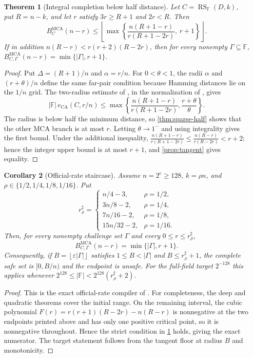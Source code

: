 \documentclass[11pt,a4paper]{amsart}
\numberwithin{equation}{section}
\newtheorem{theorem}{Theorem}[section]
\newtheorem{corollary}[theorem]{Corollary}
\theoremstyle{remark}
\DeclareMathOperator{\RS}{RS}
\DeclareMathOperator{\MCA}{MCA}
\DeclareMathOperator{\CA}{CA}
\newcommand{\F}{\mathbb F}
\newcommand{\eps}{\varepsilon}
\newcommand{\floor}[1]{\left\lfloor#1\right\rfloor}
\begin{document}
\begin{theorem}[Integral completion below half distance]\label{thm:integral-half}
Let $C=\RS_{\F}(D,k)$, put $R=n-k$, and let $r$ satisfy $3r\ge R+1$ and $2r<R$.  Then
\[
 B_C^{\MCA}(n-r)\le
 \floor{\max\left\{\frac{n(R+1-r)}{r(R+1-2r)},\ r+1\right\}}.
\]
If in addition $n(R-r)<r(r+2)(R-2r)$, then for every nonempty $\Gamma\subseteq\F$,
$B_{C,\Gamma}^{\MCA}(n-r)=\min\{|\Gamma|,r+1\}$.
\end{theorem}

\begin{proof}
Put $\Delta=(R+1)/n$ and $\alpha=r/n$.  For $0<\theta<1$, the radii $\alpha$ and $(r+\theta)/n$ define the same far-pair condition because Hamming distances lie on the $1/n$ grid.  The two-radius estimate of \cite[Theorem~1.3]{BCHKS25}, in the normalization of \cite[Theorem ``Integral BCHKS completion'']{ChoShort26}, gives
\[
 |\F|\,e_{\CA}(C,r/n)\le
 \max\left\{\frac{n(R+1-r)}{r(R+1-2r)},\frac{r+\theta}{\theta}\right\}.
\]
The radius is below half the minimum distance, so \cref{thm:sparse-half} shows that the other MCA branch is at most $r$.  Letting $\theta\to1^-$ and using integrality gives the first bound.  Under the additional inequality,
$\frac{n(R+1-r)}{r(R+1-2r)}\le\frac{n(R-r)}{r(R-2r)}<r+2$; hence the integer upper bound is at most $r+1$, and \cref{prop:tangent} gives equality.
\end{proof}

\begin{corollary}[Official-rate staircase]\label{cor:official-half}
Assume $n=2^e\ge128$, $k=\rho n$, and $\rho\in\{1/2,1/4,1/8,1/16\}$.  Put
\[
 r_\rho^\sharp=\begin{cases}
 n/4-3,&\rho=1/2,\\
 3n/8-2,&\rho=1/4,\\
 7n/16-2,&\rho=1/8,\\
 15n/32-2,&\rho=1/16.
 \end{cases}
\]
Then, for every nonempty challenge set $\Gamma$ and every $0\le r\le r_\rho^\sharp$,
\[
 B_{C,\Gamma}^{\MCA}(n-r)=\min\{|\Gamma|,r+1\}.
\]
Consequently, if $B=\floor{\eps|\Gamma|}$ satisfies $1\le B<|\Gamma|$ and $B\le r_\rho^\sharp+1$, the complete safe set is $[0,B/n)$ and the endpoint is unsafe.  For the full-field target $2^{-128}$ this applies whenever $2^{128}\le|\F|<2^{128}(r_\rho^\sharp+2)$.
\end{corollary}

\begin{proof}
This is the exact official-rate compiler of \cite[Corollaries ``Official-rate staircase'' and ``Almost-half-distance target compiler'']{ChoShort26}.  For completeness, the deep and quadratic theorems cover the initial range.  On the remaining interval, the cubic polynomial
$F(r)=r(r+1)(R-2r)-n(R-r)$ is nonnegative at the two endpoints printed above and has only one positive critical point, so it is nonnegative throughout.  Hence the strict condition in \cref{thm:integral-half} holds, giving the exact numerator.  The target statement follows from the tangent floor at radius $B$ and monotonicity.
\end{proof}
\end{document}
